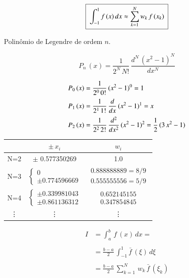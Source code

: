 \begin{enumerate}
\[
 \quadricular{\displaystyle \int_{-1}^1 f\,(x) \, dx \approx \sum_{k=1}^N w_k \, f\,(x_k)}
\]

Polinômio de Legendre de ordem $n$.

\[
 P_n\,(x) = \frac{1}{2^N\,N!} \, \frac{d^N\,(x^2 - 1)^N}{dx^N}
\]

\[
 \begin{array}{l}
  P_0\,(x) = \displaystyle \frac{1}{2^0\,0!} \, (x^2 - 1)^0 = 1 \vspace*{0.2cm} \\
  P_1\,(x) = \displaystyle \frac{1}{2^1\,1!} \, \frac{d}{dx} \, (x^2 - 1)^1 = x \vspace*{0.2cm} \\
  P_2\,(x) = \displaystyle \frac{1}{2^2\,2!} \, \frac{d^2}{dx^2} \, (x^2 - 1)^2 = \frac{1}{2}\,(3\,x^2 - 1)
 \end{array}
\]

\begin{table}[htp]
\footnotesize
	\centering
		
		\begin{tabular}{|ccc|}
		\hline		
		& \textbf{$\pm \, x_i$} & \textbf{$w_i$} \\
		\hline \hline
		N=2 & $\pm$ 0.577350269 & 1.0 \\
		\hline 
		N=3 &
		$
		\left\{
		\begin{array}{l}
		 0 \\
		 \pm 0.774596669
		\end{array}
		\right.
		$
		&
		$
		\begin{array}{l}
		 0.888888889 = 8/9 \\
		 0.555555556 = 5/9
		\end{array}
		$
		\\
		\hline 
		N=4 &
		$
		\left\{
		\begin{array}{l}
		 \pm 0.339981043 \\
		 \pm 0.861136312
		\end{array}
		\right.
		$
		&
		$
		\begin{array}{l}
		 0.652145155 \\
		 0.347854845
		\end{array}
		$
		\\
		\hline
		\vdots & \vdots & \vdots \\
		\hline
		\end{tabular}
	\label{cap2:sec5:tab1}
\end{table}

\[
 \begin{array}{ll}
  I & = \displaystyle \int_a^b \, f\,(x) \, dx = \\ \\
    & = \displaystyle \frac{b-a}{2} \, \int_{-1}^1 \bar{f}\,(\xi) \, d\xi \\ \\
    & = \displaystyle \frac{b-a}{2} \, \sum_{k=1}^N \, w_k \, \bar{f}\,(\xi_k)
 \end{array}
\]


\end{enumerate}

